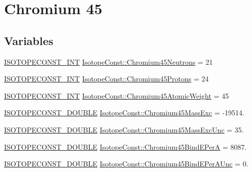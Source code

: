 \hypertarget{group___isotope_const-_chromium-_cr45}{}\section{Chromium 45}
\label{group___isotope_const-_chromium-_cr45}
\subsection*{Variables}
\begin{DoxyCompactItemize}
\item 
\mbox{\hyperlink{group___isotope_const-_macros_ga5f18360b3e99483a35c32d789e62621c}{I\+S\+O\+T\+O\+P\+E\+C\+O\+N\+S\+T\+\_\+\+I\+NT}} \mbox{\hyperlink{group___isotope_const-_chromium-_cr45_ga7880c6c9a648105839b5d1eb858c5081}{Isotope\+Const\+::\+Chromium45\+Neutrons}} = 21
\item 
\mbox{\hyperlink{group___isotope_const-_macros_ga5f18360b3e99483a35c32d789e62621c}{I\+S\+O\+T\+O\+P\+E\+C\+O\+N\+S\+T\+\_\+\+I\+NT}} \mbox{\hyperlink{group___isotope_const-_chromium-_cr45_ga878cdea65e6dfb7b32ed84dc2e62a887}{Isotope\+Const\+::\+Chromium45\+Protons}} = 24
\item 
\mbox{\hyperlink{group___isotope_const-_macros_ga5f18360b3e99483a35c32d789e62621c}{I\+S\+O\+T\+O\+P\+E\+C\+O\+N\+S\+T\+\_\+\+I\+NT}} \mbox{\hyperlink{group___isotope_const-_chromium-_cr45_ga0d035dff72b087c15ead872773205821}{Isotope\+Const\+::\+Chromium45\+Atomic\+Weight}} = 45
\item 
\mbox{\hyperlink{group___isotope_const-_macros_ga8f45a7272ce02c0b4c65c44636ed719a}{I\+S\+O\+T\+O\+P\+E\+C\+O\+N\+S\+T\+\_\+\+D\+O\+U\+B\+LE}} \mbox{\hyperlink{group___isotope_const-_chromium-_cr45_ga1836dacba9cb19e5747f9239fbfcc1e5}{Isotope\+Const\+::\+Chromium45\+Mass\+Exc}} = -\/19514.
\item 
\mbox{\hyperlink{group___isotope_const-_macros_ga8f45a7272ce02c0b4c65c44636ed719a}{I\+S\+O\+T\+O\+P\+E\+C\+O\+N\+S\+T\+\_\+\+D\+O\+U\+B\+LE}} \mbox{\hyperlink{group___isotope_const-_chromium-_cr45_gac8d10cff86741f5c13244291d0386e94}{Isotope\+Const\+::\+Chromium45\+Mass\+Exc\+Unc}} = 35.
\item 
\mbox{\hyperlink{group___isotope_const-_macros_ga8f45a7272ce02c0b4c65c44636ed719a}{I\+S\+O\+T\+O\+P\+E\+C\+O\+N\+S\+T\+\_\+\+D\+O\+U\+B\+LE}} \mbox{\hyperlink{group___isotope_const-_chromium-_cr45_gafa63603373b7acfdc89dea3988980ef2}{Isotope\+Const\+::\+Chromium45\+Bind\+E\+PerA}} = 8087.
\item 
\mbox{\hyperlink{group___isotope_const-_macros_ga8f45a7272ce02c0b4c65c44636ed719a}{I\+S\+O\+T\+O\+P\+E\+C\+O\+N\+S\+T\+\_\+\+D\+O\+U\+B\+LE}} \mbox{\hyperlink{group___isotope_const-_chromium-_cr45_ga56c0de0b7f91298fe06bdc3ff9a4e78e}{Isotope\+Const\+::\+Chromium45\+Bind\+E\+Per\+A\+Unc}} = 0.

\end{DoxyCompactItemize}

